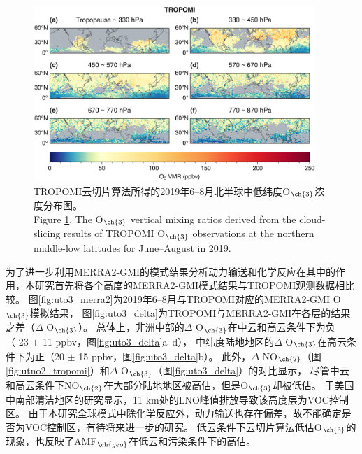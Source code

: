 \begin{figure}[H]
    \centering
    \includegraphics[width=0.95\textwidth]{./figures/uto3_tropomi.png}
    \caption{
    TROPOMI云切片算法所得的2019年6--8月北半球中低纬度O$_{\ch{3}}$浓度分布图。 \\
    Figure \ref{fig:uto3_tropomi}. The O$_{\ch{3}}$ vertical mixing ratios derived from the cloud-slicing results of TROPOMI O$_{\ch{3}}$ observations at the northern middle-low latitudes for June--August in 2019.
    }
    \label{fig:uto3_tropomi}
\end{figure}

为了进一步利用MERRA2-GMI的模式结果分析动力输送和化学反应在其中的作用，本研究首先将各个高度的MERRA2-GMI模式结果与TROPOMI观测数据相比较。
图\ref{fig:uto3_merra2}为2019年6--8月与TROPOMI对应的MERRA2-GMI O$_{\ch{3}}$模拟结果，
图\ref{fig:uto3_delta}为TROPOMI与MERRA2-GMI在各层的结果之差（$\Delta$ O$_{\ch{3}}$）。
总体上，非洲中部的$\Delta$ O$_{\ch{3}}$在中云和高云条件下为负（-23 $\pm$ 11 ppbv，图\ref{fig:uto3_delta}a--d），
中纬度陆地地区的$\Delta$ O$_{\ch{3}}$在高云条件下为正（20 $\pm$ 15 ppbv，图\ref{fig:uto3_delta}b）。
此外，$\Delta$ NO$_{\ch{2}}$（图\ref{fig:utno2_tropomi}）和$\Delta$ O$_{\ch{3}}$（图\ref{fig:uto3_delta}）的对比显示，
尽管中云和高云条件下NO$_{\ch{2}}$在大部分陆地地区被高估，但是O$_{\ch{3}}$却被低估。
\citet{Pickering.1990}于美国中南部清洁地区的研究显示，11 km处的LNO峰值排放导致该高度层为VOC控制区。
由于本研究全球模式中除化学反应外，动力输送也存在偏差，故不能确定是否为VOC控制区，有待将来进一步的研究。
低云条件下云切片算法低估O$_{\ch{3}}$的现象，也反映了AMF$_{\ch{geo}}$在低云和污染条件下的高估\citep{BelmonteRivas.2015}。

